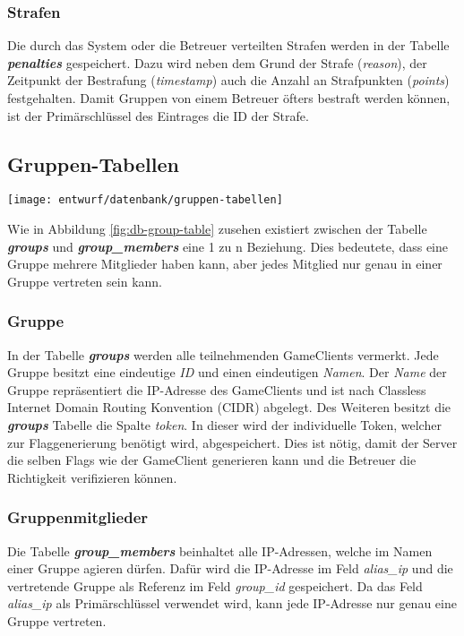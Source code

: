 \subsubsection{Strafen}
Die durch das System oder die Betreuer verteilten Strafen werden in der Tabelle \textbf{\textit{penalties}} gespeichert. Dazu wird neben dem Grund der Strafe (\textit{reason}), der Zeitpunkt der Bestrafung (\textit{timestamp}) auch die Anzahl an Strafpunkten (\textit{points}) festgehalten. Damit Gruppen von einem Betreuer öfters bestraft werden können, ist der Primärschlüssel des Eintrages die ID der Strafe.

\subsection{Gruppen-Tabellen}
\begin{center}
	\texttt{[image: entwurf/datenbank/gruppen-tabellen]}
	\label{fig:db-group-table}
\end{center}

Wie in Abbildung \ref{fig:db-group-table} zusehen existiert zwischen der Tabelle \textbf{\textit{groups}} und \textbf{\textit{group\_members}} eine 1 zu n Beziehung. Dies bedeutete, dass eine Gruppe mehrere Mitglieder haben kann, aber jedes Mitglied nur genau in einer Gruppe vertreten sein kann.

\subsubsection{Gruppe}
In der Tabelle \textbf{\textit{groups}} werden alle teilnehmenden GameClients vermerkt. Jede Gruppe besitzt eine eindeutige \textit{ID} und einen eindeutigen \textit{Namen}. Der \textit{Name} der Gruppe repräsentiert die IP-Adresse des GameClients und ist nach Classless Internet Domain Routing Konvention (CIDR) abgelegt. Des Weiteren besitzt die \textbf{\textit{groups}} Tabelle die Spalte \textit{token}. In dieser wird der individuelle Token, welcher zur Flaggenerierung benötigt wird, abgespeichert. Dies ist nötig, damit der Server die selben Flags wie der GameClient generieren kann und die Betreuer die Richtigkeit verifizieren können.

\subsubsection{Gruppenmitglieder}
Die Tabelle \textbf{\textit{group\_members}} beinhaltet alle IP-Adressen, welche im Namen einer Gruppe agieren dürfen. Dafür wird die IP-Adresse im Feld \textit{alias\_ip} und die vertretende Gruppe als Referenz im Feld \textit{group\_id} gespeichert. Da das Feld \textit{alias\_ip} als Primärschlüssel verwendet wird, kann jede IP-Adresse nur genau eine Gruppe vertreten.

